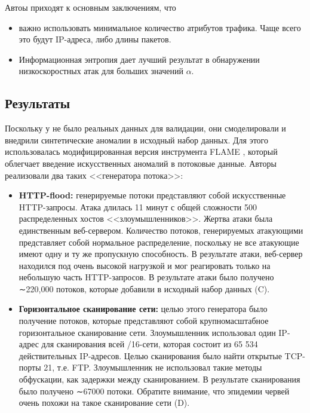 \documentclass[]{interact}
\theoremstyle{plain}%
\theoremstyle{definition}
\theoremstyle{remark}
\begin{document}
 Автоы приходят к основным заключениям, что
 \begin{itemize}
     \item важно использовать минимальное количество атрибутов трафика. Чаще всего это будут IP-адреса, либо длины пакетов.
     \item Информационная энтропия дает лучший результат в обнаружении низкоскоростных атак для больших значений $\alpha$.
 \end{itemize}

\subsection{Результаты}
Поскольку у \cite{Win11} не было реальных данных для валидации, они
смоделировали и внедрили синтетические аномалии в исходный набор данных. Для этого использовалась модифицированная версия инструмента FLAME \cite{Flame}, который облегчает введение искусственных аномалий в потоковые данные. Авторы реализовали два таких
<<генератора потока>>:
\begin{itemize}
    \item \textbf{HTTP-flood:} генерируемые потоки представляют собой искусственные HTTP-запросы. Атака длилась 11 минут с общей сложности 500 распределенных хостов <<злоумышленников>>. Жертва атаки была единственным веб-сервером. Количество потоков, генерируемых атакующими представляет собой нормальное распределение, поскольку не все атакующие имеют одну и ту же пропускную способность. В результате атаки, веб-сервер находился под очень высокой нагрузкой и мог реагировать только на небольшую часть HTTP-запросов. В результате атаки было получено ∼220,000 потоков, которые добавили в исходный набор данных (C).
    \item \textbf{Горизонтальное сканирование сети:} целью этого генератора было получение потоков, которые представляют собой крупномасштабное горизонтальное сканирование сети. Злоумышленник использовал один IP-адрес для сканирования всей /16-сети, которая состоит из 65 534 действительных IP-адресов. Целью сканирования было найти открытые TCP-порты 21, т.е. FTP. Злоумышленник не использовал такие методы обфускации, как задержки между сканированием. В результате сканирования было получено ∼67000 потоки. Обратите внимание, что эпидемии червей очень похожи на такое сканирование сети (D).
\end{itemize}
\end{document}
